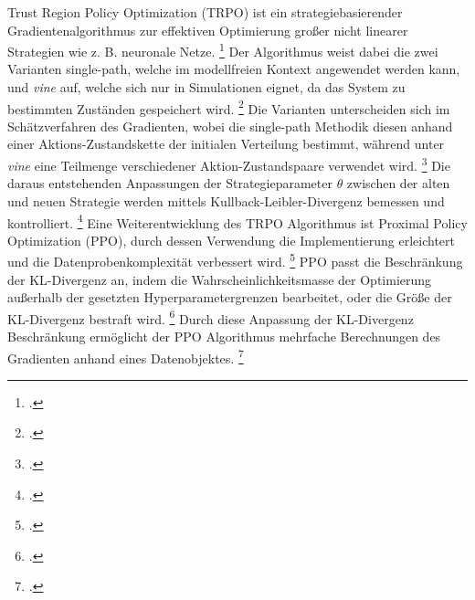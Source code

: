 Trust Region Policy Optimization (TRPO) ist ein strategiebasierender Gradientenalgorithmus zur effektiven Optimierung großer nicht linearer Strategien wie z. B. neuronale Netze. \footcite[Vgl.][S. 1]{Schulman.2015}
Der Algorithmus weist dabei die zwei Varianten single-path, welche im modellfreien Kontext angewendet werden kann, und \textit{vine} auf, welche sich nur in Simulationen eignet, da das System zu bestimmten Zuständen gespeichert wird. \footcite[Vgl.][S. 1]{Schulman.2015}
Die Varianten unterscheiden sich im Schätzverfahren des Gradienten, wobei die single-path Methodik diesen anhand einer Aktions-Zustandskette der initialen Verteilung bestimmt, während unter \textit{vine} eine Teilmenge verschiedener Aktion-Zustandspaare verwendet wird. \footcite[Vgl.][S. 4]{Schulman.2015}
Die daraus entstehenden Anpassungen der Strategieparameter $\theta$ zwischen der alten und neuen Strategie werden mittels Kullback-Leibler-Divergenz bemessen und kontrolliert. \footcite[Vgl.][S. 4]{Huang.2017}
Eine Weiterentwicklung des TRPO Algorithmus ist Proximal Policy Optimization (PPO), durch dessen Verwendung die Implementierung erleichtert und die Datenprobenkomplexität verbessert wird. \footcite[Vgl.][S. 1]{Schulman.2017}
PPO passt die Beschränkung der KL-Divergenz an, indem die Wahrscheinlichkeitsmasse der Optimierung außerhalb der gesetzten Hyperparametergrenzen bearbeitet, oder die Größe der KL-Divergenz bestraft wird. \footcite[Vgl.][S. 3f.]{Schulman.2017}
Durch diese Anpassung der KL-Divergenz Beschränkung ermöglicht der PPO Algorithmus mehrfache Berechnungen des Gradienten anhand eines Datenobjektes. \footcite[Vgl.][S. 4]{Schulman.2017}


